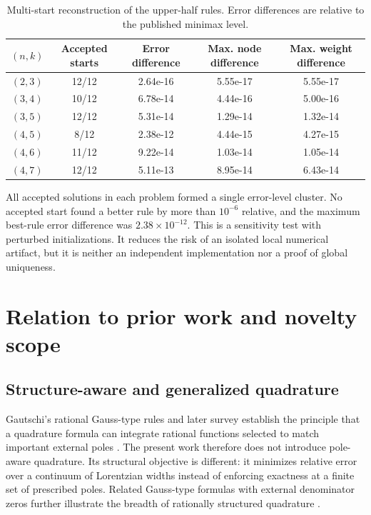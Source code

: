 \documentclass[preprint,12pt]{elsarticle}
\theoremstyle{remark}
\begin{document}
\begin{table}[ht]
\centering
\caption{Multi-start reconstruction of the upper-half
rules. Error differences are relative to the published minimax level.}
\label{tab:multistart}
\scriptsize
\begin{tabular}{ccccc}
\toprule
\((n,k)\) & Accepted starts & Error difference &
Max. node difference & Max. weight difference\\
\midrule
$(2,3)$ & 12/12 & 2.64e-16 & 5.55e-17 & 5.55e-17 \\
$(3,4)$ & 10/12 & 6.78e-14 & 4.44e-16 & 5.00e-16 \\
$(3,5)$ & 12/12 & 5.31e-14 & 1.29e-14 & 1.32e-14 \\
$(4,5)$ & 8/12 & 2.38e-12 & 4.44e-15 & 4.27e-15 \\
$(4,6)$ & 11/12 & 9.22e-14 & 1.03e-14 & 1.05e-14 \\
$(4,7)$ & 12/12 & 5.11e-13 & 8.95e-14 & 6.43e-14 \\
\bottomrule
\end{tabular}
\end{table}

All accepted solutions in each problem formed a single error-level
cluster. No accepted start found a better rule by more than
\(10^{-6}\) relative, and the maximum best-rule error difference was
\(2.38\times10^{-12}\). This is a sensitivity test with perturbed initializations. It reduces the risk of an isolated local numerical artifact, but it is neither an independent implementation nor a proof of global uniqueness.

\section{Relation to prior work and novelty scope}

\subsection{Structure-aware and generalized quadrature}

Gautschi's rational Gauss-type rules and later survey establish the principle that a
quadrature formula can integrate rational functions selected to match
important external poles \cite{gautschi1993,gautschi2001}. The present work therefore
does not introduce pole-aware quadrature. Its structural objective is
different: it minimizes relative error over a continuum of Lorentzian
widths instead of enforcing exactness at a finite set of prescribed
poles. Related Gauss-type formulas with external denominator zeros
further illustrate the breadth of rationally structured quadrature
\cite{tomanovic2023}.
\end{document}
